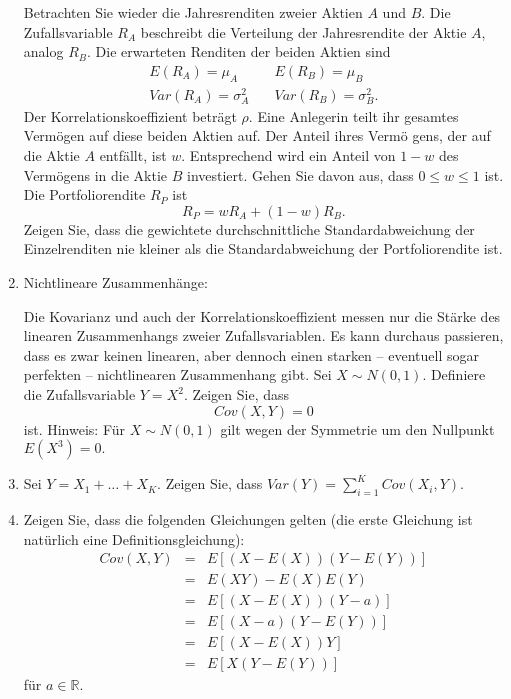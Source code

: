 \begin{enumerate}
Betrachten Sie wieder die Jahresrenditen zweier Aktien $A$ und $B$. Die
Zufallsvariable $R_{A}$ beschreibt die Verteilung der Jahresrendite der
Aktie $A$, analog $R_{B}$. Die erwarteten Renditen der beiden Aktien sind%
\begin{equation*}
\begin{array}{ll}
E(R_{A})=\mu _{A} & \quad E(R_{B})=\mu _{B} \\ 
Var(R_{A})=\sigma _{A}^{2} & \quad Var(R_{B})=\sigma _{B}^{2}.%
\end{array}%
\end{equation*}%
Der Korrelationskoeffizient betr\"{a}gt $\rho $. Eine Anlegerin teilt ihr
gesamtes Verm\"{o}gen auf diese beiden Aktien auf. Der Anteil ihres Verm\"{o}%
gens, der auf die Aktie $A$ entf\"{a}llt, ist $w$. Entsprechend wird ein
Anteil von $1-w$ des Verm\"{o}gens in die Aktie $B$ investiert. Gehen Sie
davon aus, dass $0\leq w\leq 1$ ist. Die Portfoliorendite $R_{P}$ ist%
\begin{equation*}
R_{P}=wR_{A}+(1-w)R_{B}.
\end{equation*}
Zeigen Sie, dass die gewichtete durchschnittliche Standardabweichung der
Einzelrenditen nie kleiner als die Standardabweichung der Portfoliorendite
ist.

\item Nichtlineare Zusammenh\"{a}nge:

Die Kovarianz und auch der Korrelationskoeffizient messen nur die St\"{a}rke
des linearen Zusammenhangs zweier Zufallsvariablen. Es kann durchaus
passieren, dass es zwar keinen linearen, aber dennoch einen starken --
eventuell sogar perfekten -- nichtlinearen Zusammenhang gibt. Sei $X\sim
N\left( 0,1\right) $. Definiere die Zufallsvariable $Y=X^{2}$. Zeigen Sie,
dass 
\begin{equation*}
Cov\left( X,Y\right) =0
\end{equation*}%
ist. Hinweis: F\"{u}r $X\sim N\left( 0,1\right) $ gilt wegen der Symmetrie
um den Nullpunkt $E\left( X^{3}\right) =0.$

\item Sei $Y=X_{1}+\ldots +X_{K}$. Zeigen Sie, dass $Var\left(
Y\right) =\sum_{i=1}^{K}Cov\left( X_{i},Y\right) .$

\item Zeigen Sie, dass die folgenden Gleichungen gelten (die
erste Gleichung ist nat\"{u}rlich eine Definitionsgleichung):%
\begin{eqnarray*}
Cov(X,Y) &=&E\left[ \left( X-E(X)\right) \left( Y-E(Y)\right) \right]  \\
&=&E(XY)-E(X)E(Y) \\
&=&E\left[ \left( X-E(X)\right) \left( Y-a\right) \right]  \\
&=&E\left[ \left( X-a\right) \left( Y-E(Y)\right) \right]  \\
&=&E\left[ \left( X-E(X)\right) Y\right]  \\
&=&E\left[ X\left( Y-E(Y)\right) \right] 
\end{eqnarray*}%
f\"{u}r $a\in \mathbb{R}.$


\end{enumerate}

